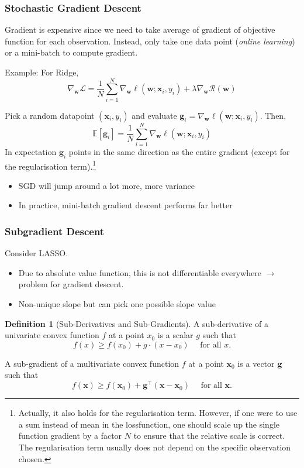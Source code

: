 \documentclass[11pt, %
	oneside, %
	english, %
	onehalfspacing, %
	parskip, %
	]{article} %
\theoremstyle{definition}
\newtheorem{definition}{Definition}
\begin{document}
\subsubsection*{Stochastic Gradient Descent}
Gradient is expensive since we need to take average of gradient of objective function for each observation. Instead, only take one data point (\emph{online learning}) or a mini-batch to compute gradient.

Example: For Ridge,
$$
\nabla_{\mathbf{w}} \mathcal{L}=\frac{1}{N} \sum_{i=1}^N \nabla_{\mathbf{w}} \ell\left(\mathbf{w} ; \mathbf{x}_i, y_i\right)+\lambda \nabla_{\mathbf{w}} \mathcal{R}(\mathbf{w})
$$

Pick a random datapoint $\left(\mathbf{x}_i, y_i\right)$ and evaluate $\mathbf{g}_i=\nabla_{\mathbf{w}} \ell\left(\mathbf{w} ; \mathbf{x}_i, y_i\right)$. Then,
$$
\mathbb{E}\left[\mathbf{g}_i\right]=\frac{1}{N} \sum_{i=1}^N \nabla_{\mathbf{w}} \ell\left(\mathbf{w} ; \mathbf{x}_i, y_i\right)
$$
In expectation $\mathbf{g}_i$ points in the same direction as the entire gradient (except for the regularisation term).\footnote{Actually, it also holds for the regularisation term. However, if one were to use a sum instead of mean in the lossfunction, one should scale up the single function gradient by a factor $N$ to ensure that the relative scale is correct. The regularisation term usually does not depend on the specific observation chosen.}

\begin{itemize}
	\item SGD will jump around a lot more, more variance
	\item In practice, mini-batch gradient descent performs far better
\end{itemize}

\subsubsection*{Subgradient Descent}

Consider LASSO.
\begin{itemize}
	\item Due to absolute value function, this is not differentiable everywhere $\to$ problem for gradient descent.
	\item Non-unique slope but can pick one possible slope value
\end{itemize}

\begin{definition}[Sub-Derivatives and Sub-Gradients]
	A sub-derivative of a univariate convex function $f$ at a point $x_0$ is a scalar $g$ such that
	$$
	f(x) \geq f\left(x_0\right)+g \cdot\left(x-x_0\right) \quad \text { for all } x .
	$$

	A sub-gradient of a multivariate convex function $f$ at a point $\mathbf{x}_0$ is a vector $\mathbf{g}$ such that
	$$
	f(\mathbf{x}) \geq f\left(\mathbf{x}_0\right)+\mathbf{g}^{\boldsymbol{\top}}\left(\mathbf{x}-\mathbf{x}_0\right) \quad \text { for all } \mathbf{x} .
	$$
\end{definition}
\end{document}
